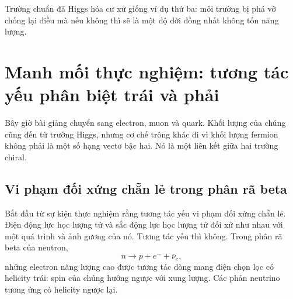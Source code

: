Trường chuẩn đã Higgs hóa cư xử giống ví dụ thứ ba: môi trường bị phá vỡ chống lại điều mà nếu không thì sẽ là một độ dời đồng nhất không tốn năng lượng.

\begin{classroomqa}
\end{classroomqa}

\begin{classroomqa}
\end{classroomqa}

\section{Manh mối thực nghiệm: tương tác yếu phân biệt trái và phải}

Bây giờ bài giảng chuyển sang electron, muon và quark. Khối lượng của chúng cũng đến từ trường Higgs, nhưng cơ chế trông khác đi vì khối lượng fermion không phải là một số hạng vectơ bậc hai. Nó là một liên kết giữa hai trường chiral.

\subsection{Vi phạm đối xứng chẵn lẻ trong phân rã beta}

Bắt đầu từ sự kiện thực nghiệm rằng tương tác yếu vi phạm đối xứng chẵn lẻ. Điện động lực học lượng tử và sắc động lực học lượng tử đối xử như nhau với một quá trình và ảnh gương của nó. Tương tác yếu thì không. Trong phân rã beta của neutron,
\begin{equation}
  n\longrightarrow p+e^-+\bar\nu_e,
  \label{eq:l09-beta-decay}
\end{equation}
những electron năng lượng cao được tương tác dòng mang điện chọn lọc có helicity trái: spin của chúng hướng ngược với xung lượng. Các phản neutrino tương ứng có helicity ngược lại.

